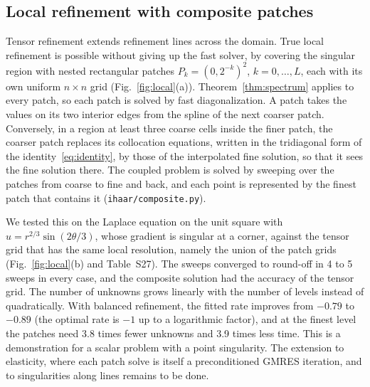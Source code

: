 \documentclass[preprint,12pt]{elsarticle}
\theoremstyle{remark}
\begin{document}
\subsection{Local refinement with composite patches}\label{sec:local}
Tensor refinement extends refinement lines across the domain. True local refinement is possible without
giving up the fast solver, by covering the singular region with nested rectangular patches
$P_k=(0,2^{-k})^2$, $k=0,\dots,L$, each with its own uniform $n\times n$ grid (Fig.~\ref{fig:local}(a)).
Theorem~\ref{thm:spectrum} applies to every patch, so each patch is solved by fast diagonalization. A patch
takes the values on its two interior edges from the spline of the next coarser patch. Conversely, in a
region at least three coarse cells inside the finer patch, the coarser patch replaces its collocation
equations, written in the tridiagonal form of the identity~\eqref{eq:identity}, by those of the
interpolated fine solution, so that it sees the fine solution there. The coupled problem is solved by
sweeping over the patches from coarse to fine and back, and each point is represented by the finest patch
that contains it (\texttt{ihaar/composite.py}).

We tested this on the Laplace equation on the unit square with $u=r^{2/3}\sin(2\theta/3)$, whose gradient
is singular at a corner, against the tensor grid that has the same local resolution, namely the union of
the patch grids (Fig.~\ref{fig:local}(b) and Table~S27). The sweeps converged to round-off in 4 to 5
sweeps in every case, and the composite solution had the accuracy of the tensor grid. The number of unknowns
grows linearly with the number of levels instead of quadratically. With balanced refinement, the fitted rate
improves from $-0.79$ to $-0.89$ (the optimal rate is $-1$ up to a logarithmic factor), and at the
finest level the patches need 3.8 times fewer unknowns and 3.9 times less time.
This is a demonstration for a scalar problem with a point singularity. The extension to elasticity, where
each patch solve is itself a preconditioned GMRES iteration, and to singularities along lines remains to be
done.
\end{document}
